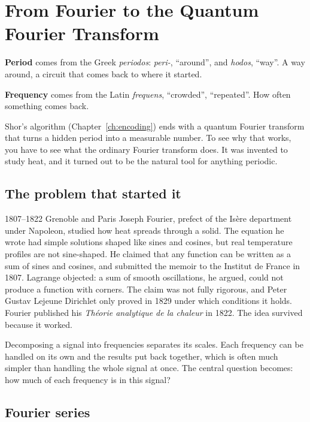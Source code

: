 \chapter{From Fourier to the Quantum Fourier Transform}\label{ch:fourier}

\begin{etymology}
\textbf{Period} comes from the Greek \emph{periodos}: \emph{peri-}, ``around'',
and \emph{hodos}, ``way''. A way around, a circuit that comes back to where it
started.

\textbf{Frequency} comes from the Latin \emph{frequens}, ``crowded'',
``repeated''. How often something comes back.
\end{etymology}

Shor's algorithm (Chapter~\ref{ch:encoding}) ends with a quantum Fourier transform
that turns a hidden period into a measurable number. To see why that works, you
have to see what the ordinary Fourier transform does. It was invented to study heat,
and it turned out to be the natural tool for anything periodic.

\section{The problem that started it}

\begin{history}{1807--1822 \textperiodcentered{} Grenoble and Paris}
Joseph Fourier, prefect of the Isère department under Napoleon, studied how heat
spreads through a solid. The equation he wrote had simple solutions shaped like
sines and cosines, but real temperature profiles are not sine-shaped. He claimed
that any function can be written as a sum of sines and cosines, and submitted the
memoir to the Institut de France in 1807. Lagrange objected: a sum of smooth
oscillations, he argued, could not produce a function with corners. The claim was
not fully rigorous, and Peter Gustav Lejeune Dirichlet only proved in 1829 under
which conditions it holds. Fourier published his \emph{Théorie analytique de la
chaleur} in 1822. The idea survived because it worked.
\end{history}

Decomposing a signal into frequencies separates its scales. Each frequency can be
handled on its own and the results put back together, which is often much simpler
than handling the whole signal at once. The central question becomes: how much of
each frequency is in this signal?

\section{Fourier series}

